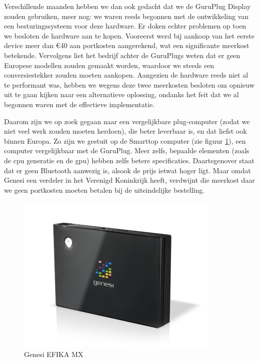 Verschillende maanden hebben we dan ook gedacht dat we de GuruPlug Display zouden gebruiken, meer nog: we waren reeds begonnen met de ontwikkeling van een besturingssysteem voor deze hardware. Er doken echter problemen op toen we besloten de hardware aan te kopen. Vooreerst werd bij aankoop van het eerste device meer dan \euro 40 aan portkosten aangerekend, wat een significante meerkost betekende. Vervolgens liet het bedrijf achter de GuruPlugs weten dat er geen Europese modellen zouden gemaakt worden, waardoor we steeds een conversiestekker zouden moeten aankopen. Aangezien de hardware reeds niet al te performant was, hebben we wegens deze twee meerkosten besloten om opnieuw uit te gaan kijken naar een alternatieve oplossing, ondanks het feit dat we al begonnen waren met de effectieve implementatie.

Daarom zijn we op zoek gegaan naar een vergelijkbare plug-computer (zodat we niet veel werk zouden moeten herdoen), die beter leverbaar is, en dat liefst ook binnen Europa. Zo zijn we gestuit op de  Smarttop computer (zie figuur \ref{fig:hw:kiosk:efika}), een computer vergelijkbaar met de GuruPlug. Meer zelfs, bepaalde elementen (zoals de \ac{cpu} generatie en de \ac{gpu}) hebben zelfs betere specificaties. Daartegenover staat dat er geen Bluetooth aanwezig is, alsook de prijs ietwat hoger ligt. Maar omdat Genesi een verdeler in het Verenigd Koninkrijk heeft, verdwijnt die meerkost daar we geen portkosten moeten betalen bij de uiteindelijke bestelling.

\begin{figure}
	\includegraphics[width=\textwidth]{afbeeldingen/EFIKA_MX}
	\caption{Genesi EFIKA MX}
	\label{fig:hw:kiosk:efika}
\end{figure}

